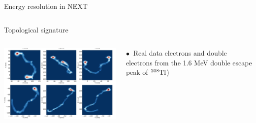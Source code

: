 \documentclass [aspectratio=169]{beamer}
\newcommand{\qbb}{\ensuremath{Q_{\beta\beta}}}
\newcommand{\TL}{\ensuremath{{}^{208}{\rm Tl}}}
\begin{document}
\begin{frame}{Energy resolution in NEXT}
\begin{columns}
%
%
  
\end{columns}
\end{frame}

\begin{frame}{Topological signature}
\begin{columns}
\includegraphics[scale=0.50]{deconv1e2e.png}

$\bullet~$ Real data electrons and double electrons from the 1.6 MeV double escape peak of \TL) 
 \end{columns}
\end{frame}


\end{document}
